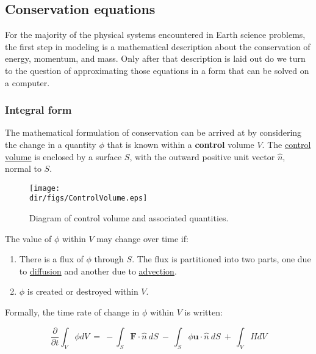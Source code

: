 \subsection{Conservation equations}

For the majority of the physical systems encountered in Earth science problems, the first step in modeling is a
mathematical description about the conservation of energy, momentum, and mass. Only after that description is
laid out do we turn to the question of approximating those equations in a form that can be solved on a computer. 

\subsubsection{Integral form}

The mathematical formulation of conservation can be arrived at by considering the change in a quantity 
$\phi$ that is known within a \textbf{control} volume $V$. The \href{http://en.wikipedia.org/wiki/Control_volume}
{control volume} is enclosed by a surface $S$, with the outward positive unit vector $\hat n$, normal to $S$.

\begin{figure}
  \begin{center}
    \texttt{[image: \\dir/figs/ControlVolume.eps]}
  \end{center}
  \caption{Diagram of control volume and associated quantities.}
  \label{fig:controlvol}
\end{figure} 

The value of $\phi$ within $V$ may change over time if:

\begin{enumerate}
\itemsep1pt\parskip0pt
\item
  There is a flux of $\phi$ through $S$. The flux is partitioned into two parts,
  one due to \href{http://en.wikipedia.org/wiki/Diffusion}{diffusion} and another 
  due to \href{http://en.wikipedia.org/wiki/Advection}{advection}.
\item
  $\phi$ is created or destroyed within $V$.
\end{enumerate}

Formally, the time rate of change in $\phi$ within $V$ is written:

\begin{equation}
{\frac{ \partial }{ \partial t}} { \int }_{ V} \phi dV~ = ~ -{ \int }_{ S} {\mathbf F}
    {\cdot} \hat n~ dS~ - ~{ \int }_{ S} \phi {\mathbf u} {\cdot} \hat n ~ dS~
    + ~{ \int }_{ V} HdV
    \label{eq:intcons}
\end{equation}

